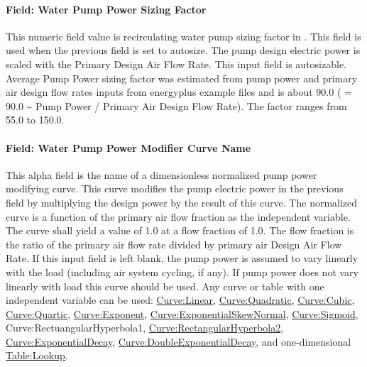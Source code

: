 \paragraph{Field: Water Pump Power Sizing Factor}\label{field-water-pump-power-sizing-factor}

This numeric field value is recirculating water pump sizing factor in \si{\wattperVolumeFlowRate}.
This field is used when the previous field is set to autosize. The pump design electric power is scaled with the Primary Design Air Flow Rate. This input field is autosizable.
Average Pump Power sizing factor was estimated from pump power and primary air design flow rates inputs from energyplus example files and
is about \SI{90.0}{\wattperVolumeFlowRate} ( = 90.0 \textasciitilde{} Pump Power / Primary Air Design Flow Rate). The factor ranges from 55.0 to \SI{150.0}{\wattperVolumeFlowRate}.

\paragraph{Field: Water Pump Power Modifier Curve Name}\label{field-water-pump-power-modifier-curve-name}

This alpha field is the name of a dimensionless normalized pump power modifying curve. This curve modifies the pump electric power in the previous field by multiplying the design power by the result of this curve. The normalized curve is a function of the primary air flow fraction as the independent variable. The curve shall yield a value of 1.0 at a flow fraction of 1.0. The flow fraction is the ratio of the primary air flow rate divided by primary air Design Air Flow Rate. If this input field is left blank, the pump power is assumed to vary linearly with the load (including air system cycling, if any). If pump power does not vary linearly with load this curve should be used. Any curve or table with one independent variable can be used: \hyperref[curvelinear]{Curve:Linear}, \hyperref[curvequadratic]{Curve:Quadratic}, \hyperref[curvecubic]{Curve:Cubic}, \hyperref[curvequartic]{Curve:Quartic}, \hyperref[curveexponent]{Curve:Exponent}, \hyperref[curveexponentialskewnormal]{Curve:ExponentialSkewNormal}, \hyperref[curvesigmoid]{Curve:Sigmoid}, Curve:RectuangularHyperbola1, \hyperref[curverectangularhyperbola2]{Curve:RectangularHyperbola2}, \hyperref[curveexponentialdecay]{Curve:ExponentialDecay}, \hyperref[curvedoubleexponentialdecay]{Curve:DoubleExponentialDecay}, and one-dimensional \hyperref[tablelookup]{Table:Lookup}.

